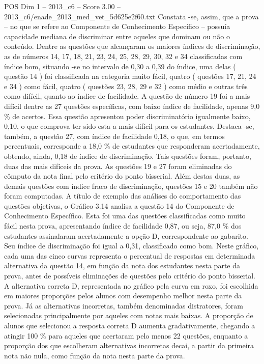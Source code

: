 \begin{textsample}{POS Dim 1 – 2013\_c6 – Score 3.00 – 2013\_c6/enade\_2013\_med\_vet\_5d625e2f60.txt}
Constata -se, assim, que a prova – no que se refere ao Componente de Conhecimento Específico – possuía capacidade mediana de discriminar entre aqueles que dominam ou não o conteúdo.
Dentre as questões que alcançaram os maiores índices de discriminação, as de números 14, 17, 18, 21, 23, 24, 25, 28, 29, 30, 32 e 34 classificadas com índice bom, situando -se no intervalo de 0,30 a 0,39 do índice, uma delas ( questão 14 ) foi classificada na categoria muito fácil, quatro ( questões 17, 21, 24 e 34 ) como fácil, quatro ( questões 23, 28, 29 e 32 ) como médio e outras três como difícil, quanto ao índice de facilidade.
A questão de número 19 foi a mais difícil dentre as 27 questões específicas, com baixo índice de facilidade, apenas 9,0 \% de acertos.
Essa questão apresentou poder discriminatório igualmente baixo, 0,10, o que comprova ter sido esta a mais difícil para os estudantes.
Destaca -se, também, a questão 27, com índice de facilidade 0,18, o que, em termos percentuais, corresponde a 18,0 \% de estudantes que responderam acertadamente, obtendo, ainda, 0,18 de índice de discriminação.
Tais questões foram, portanto, duas das mais difíceis da prova.
As questões 19 e 27 foram eliminadas do cômputo da nota final pelo critério do ponto bisserial.
Além destas duas, as demais questões com índice fraco de discriminação, questões 15 e 20 também não foram computadas.
A título de exemplo das análises do comportamento das questões objetivas, o Gráfico 3.14 analisa a questão 14 do Componente de Conhecimento Específico.
Esta foi uma das questões classificadas como muito fácil nesta prova, apresentando índice de facilidade 0,87, ou seja, 87,0 \% dos estudantes assinalaram acertadamente a opção D, correspondente ao gabarito.
Seu índice de discriminação foi igual a 0,31, classificado como bom.
Neste gráfico, cada uma das cinco curvas representa o percentual de respostas em determinada alternativa da questão 14, em função da nota dos estudantes nesta parte da prova, antes de possíveis eliminações de questões pelo critério do ponto bisserial.
A alternativa correta D, representada no gráfico pela curva em roxo, foi escolhida em maiores proporções pelos alunos com desempenho melhor nesta parte da prova.
Já as alternativas incorretas, também denominadas distratores, foram selecionadas principalmente por aqueles com notas mais baixas.
A proporção de alunos que selecionou a resposta correta D aumenta gradativamente, chegando a atingir 100 \% para aqueles que acertaram pelo menos 22 questões, enquanto a proporção dos que escolheram alternativas incorretas decai, a partir da primeira nota não nula, como função da nota nesta parte da prova.

\end{textsample}
